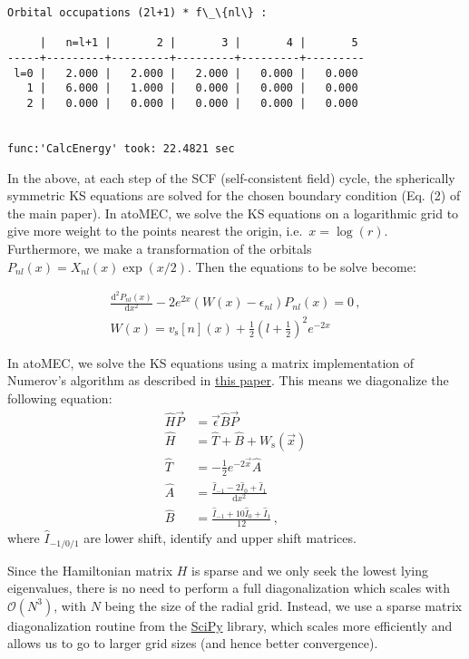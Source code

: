 \documentclass[11pt]{article}
\begin{document}
\begin{Verbatim}[commandchars=\\\{\}]
Orbital occupations (2l+1) * f\_\{nl\} :

     |   n=l+1 |       2 |       3 |       4 |       5
-----+---------+---------+---------+---------+---------
 l=0 |   2.000 |   2.000 |   2.000 |   0.000 |   0.000
   1 |   6.000 |   1.000 |   0.000 |   0.000 |   0.000
   2 |   0.000 |   0.000 |   0.000 |   0.000 |   0.000


func:'CalcEnergy' took: 22.4821 sec
    \end{Verbatim}

    In the above, at each step of the SCF (self-consistent field) cycle, the
spherically symmetric KS equations are solved for the chosen boundary
condition (Eq. (2) of the main paper). In atoMEC, we solve the KS
equations on a logarithmic grid to give more weight to the points
nearest the origin, i.e.~\(x=\log(r)\). Furthermore, we make a
transformation of the orbitals \(P_{nl}(x) = X_{nl}(x)\exp(x/2)\). Then
the equations to be solve become:

\begin{gather}
\frac{\textrm{d}^2 P_{nl}(x)}{\textrm{d}x^2} - 2e^{2x}(W(x)-\epsilon_{nl})P_{nl}(x)=0\,,\\
W(x) = v_\textrm{s}[n](x) + \frac{1}{2}\left(l+\frac{1}{2}\right)^2 e^{-2x}
\end{gather}

In atoMEC, we solve the KS equations using a matrix implementation of
Numerov's algorithm as described in
\href{https://aapt.scitation.org/doi/full/10.1119/1.4748813?casa_token=UMs6bxc3iB0AAAAA\%3AonvjnFq-KyEXZpEzUfGfyqQoNrMoP6AI0Wi7nrZrILOCM9Ah55XACGen5VLr-civFUtr2sVuCpw}{this
paper}. This means we diagonalize the following equation: \begin{align}
\hat{H}\vec{P} &= \vec{\epsilon} \hat{B} \vec{P} \\
\hat{H} &= \hat{T} + \hat{B} + W_\textrm{s}(\vec{x}) \\
\hat{T} &= -\frac{1}{2} e^{-2\vec{x}} \hat{A} \\
\hat{A} &= \frac{\hat{I}_{-1} -2\hat{I}_0 + \hat{I}_1}{\textrm{d}x^2} \\
\hat{B} &= \frac{\hat{I}_{-1} +10\hat{I}_0 + \hat{I}_1}{12}\,,
\end{align} where \(\hat{I}_{-1/0/1}\) are lower shift, identify and
upper shift matrices.

Since the Hamiltonian matrix \(H\) is sparse and we only seek the lowest
lying eigenvalues, there is no need to perform a full diagonalization
which scales with \(\mathcal{O}(N^3)\), with \(N\) being the size of the
radial grid. Instead, we use a sparse matrix diagonalization routine
from the \href{https://scipy.org/}{SciPy} library, which scales more
efficiently and allows us to go to larger grid sizes (and hence better
convergence).
\end{document}
